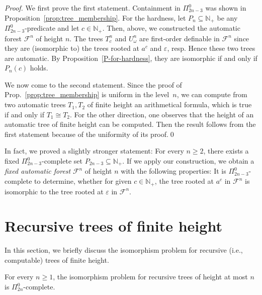 \documentclass[envcountsame]{llncs}
\newcommand{\F}{\mathcal F}
\newcommand{\N}{\mathbb N}
\begin{document}
\begin{proof}
  We first prove the first statement. Containment in $\Pi^0_{2n-3}$
  was shown in Proposition~\ref{prop:tree_membership}. For the hardness, let
  $P_n\subseteq\N_+$ be any $\Pi^0_{2n-3}$-predicate and let
  $c\in\N_+$. Then, above, we constructed the automatic forest
  $\mathcal F^n$ of height $n$. The trees $T^n_c$ and $U^n_\omega$ are first-order
  definable in $\mathcal F^n$ since they are (isomorphic to) the trees
  rooted at $a^c$ and $\varepsilon$, resp. Hence these two
  trees are automatic. By Proposition~\ref{P-for-hardness}, they are
  isomorphic if and only if $P_n(c)$ holds.

  We now come to the second statement. Since the proof of 
  Prop.~\ref{prop:tree_membership} is uniform in the level~$n$, we can compute
  from two automatic trees $T_1, T_2$ of finite height an arithmetical
  formula, which is true if and only if $T_1 \cong T_2$. For the other
  direction, one observes that the height of an
  automatic tree of finite height can be computed. Then the result
  follows from the first statement because of the uniformity of its
  proof.\qed
\end{proof}
In fact, we proved a slightly stronger statement:
For every $n \geq 2$, there exists a fixed $\Pi^0_{2n-3}$-complete
set $P_{2n-3} \subseteq \N_+$. If we apply our construction, we obtain a {\em
  fixed automatic forest} $\F^n$
of height $n$ 
with the following properties: It is $\Pi^0_{2n-3}$-complete to determine, whether 
for given $c \in \N_+$, the tree rooted at $a^c$ in $\F^n$ is isomorphic to the 
tree rooted at $\varepsilon$ in $\F^n$.



\section{Recursive trees of finite height}

In this section, we briefly discuss the isomorphism problem for
recursive (i.e., computable) trees of finite height.

\begin{theorem}
  For every $n \geq 1$, the isomorphism problem for recursive trees of
  height at most $n$ is $\Pi^0_{2n}$-complete.
\end{theorem}
\end{document}
